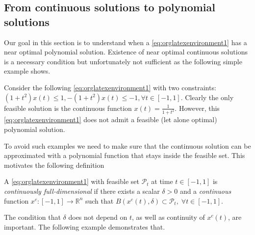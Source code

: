 \documentclass[moor]{informs1}
\begin{document}
\subsection{From continuous solutions to polynomial solutions}
\label{sec:orgheadline9}
\label{orgtarget7}
Our goal in this section is to understand when a \ref{eq:orglatexenvironment1} has a near optimal polynomial solution. Existence of near optimal continuous solutions is a necessary condition but unfortunately not sufficient as the following simple example shows. 

\begin{myexample}
Consider the following \ref{eq:orglatexenvironment1} with two constraints: \((1+t^2) x(t) \le 1, -(1+t^2) x(t) \le -1, \forall t \in [-1, 1]\). Clearly the only feasible solution is the continuous function \(x(t) = \frac1{1+t^2}\). However, this \ref{eq:orglatexenvironment1} does not admit a feasible (let alone optimal) polynomial solution.
\end{myexample}

To avoid such examples we need to make sure that the continuous solution can be approximated with a polynomial function that stays inside the feasible set. This motivates the following definition

\begin{definition}
A \ref{eq:orglatexenvironment1} with feasible set \(\mathcal P_t\) at time \(t \in [-1, 1]\) is \emph{continuously full-dimensional} if there exists a scalar \(\delta > 0\) and a \emph{continuous} function \(x^c: [-1, 1] \rightarrow \mathbb R^n\) such that \(B(x^c(t), \delta) \subset \mathcal P_t, \; \forall t \in [-1, 1]\).
\label{orgspecialblock15}

\end{definition}


The condition that \(\delta\) does not depend on \(t\), as well as continuity of \(x^c(t)\), are important. The following example demonstrates that.
\end{document}
